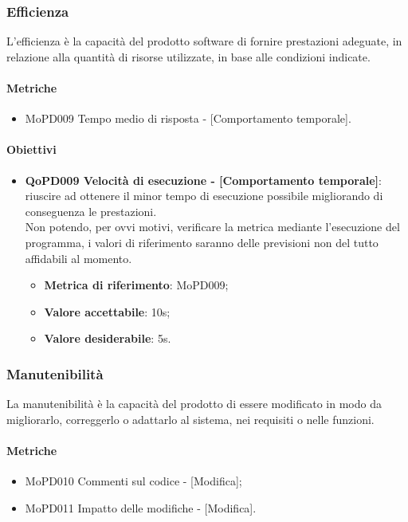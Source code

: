 \documentclass[../piano-di-qualifica.tex]{subfiles}
\begin{document}
\subsubsection{Efficienza}%
\label{sub:efficienza}
L'efficienza è la capacità del prodotto software di fornire prestazioni adeguate, in relazione alla quantità di
risorse utilizzate, in base alle condizioni indicate.

\paragraph{Metriche}
\label{sub:metriche}
\begin{itemize}
    \item MoPD009 Tempo medio di risposta - [Comportamento temporale].
\end{itemize}

\paragraph{Obiettivi}
\label{sub:obiettivi}
\begin{itemize}
    \item \textbf{QoPD009 Velocità di esecuzione - [Comportamento temporale]}: riuscire ad ottenere il minor tempo di esecuzione possibile migliorando di conseguenza le prestazioni.
    \\ Non potendo, per ovvi motivi, verificare la metrica mediante l'esecuzione del programma, i valori di riferimento saranno delle previsioni non del tutto affidabili al momento.
        \begin{itemize}
            \item \textbf{Metrica di riferimento}: MoPD009;
            \item \textbf{Valore accettabile}: 10s;
            \item \textbf{Valore desiderabile}: 5s.
        \end{itemize}
\end{itemize}

\subsubsection{Manutenibilità}%
\label{sub:manutenibilita}
La manutenibilità è la capacità del prodotto di essere modificato in modo da migliorarlo, correggerlo o adattarlo al sistema, nei requisiti o nelle funzioni.

\paragraph{Metriche}
\label{sub:metriche}
\begin{itemize}
    \item MoPD010 Commenti sul codice - [Modifica];
    \item MoPD011 Impatto delle modifiche - [Modifica].
\end{itemize}
\end{document}
